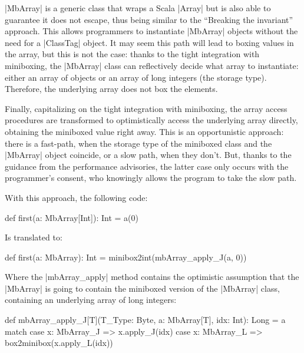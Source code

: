 

|MbArray| is a generic class that wraps a Scala |Array| but is also able to guarantee it does not escape, thus being similar to the ``Breaking the invariant'' approach. This allows programmers to instantiate |MbArray| objects without the need for a |ClassTag| object. It may seem this path will lead to boxing values in the array, but this is not the case: thanks to the tight integration with miniboxing, the |MbArray| class can reflectively decide what array to instantiate: either an array of objects or an array of long integers (the storage type). Therefore, the underlying array does not box the elements.

Finally, capitalizing on the tight integration with miniboxing, the array access procedures are transformed to optimistically access the underlying array directly, obtaining the miniboxed value right away. This is an opportunistic approach: there is a fast-path, when the storage type of the miniboxed class and the |MbArray| object coincide, or a slow path, when they don't. But, thanks to the guidance from the performance advisories, the latter case only occurs with the programmer's consent, who knowingly allows the program to take the slow path.

With this approach, the following code:

\begin{lstlisting-nobreak}
 def first(a: MbArray[Int]): Int = a(0)
\end{lstlisting-nobreak}

Is translated to:

\begin{lstlisting-nobreak}
 def first(a: MbArray): Int =
   minibox2int(mbArray_apply_J(a, 0))
\end{lstlisting-nobreak}

Where the |mbArray_apply| method contains the optimistic assumption that the |MbArray| is going to contain the miniboxed version of the |MbArray| class, containing an underlying array of long integers:

\begin{lstlisting-nobreak}
 def mbArray_apply_J[T](T_Type: Byte, a: MbArray[T], idx: Int): Long =
   a match {
     case x: MbArray_J => x.apply_J(idx)
     case x: MbArray_L => box2minibox(x.apply_L(idx))
   }
\end{lstlisting-nobreak}

